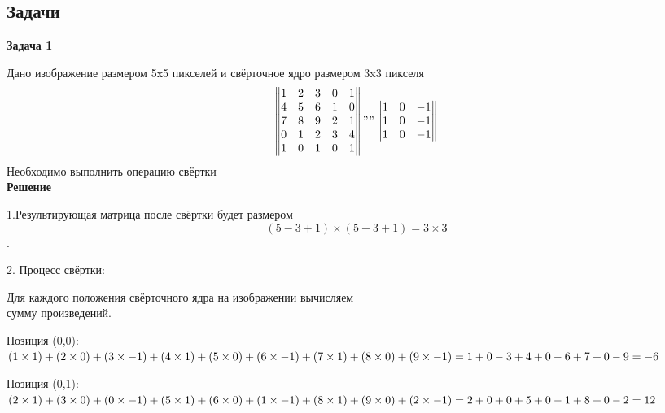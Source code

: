 \begin{description}
\begin{figure}[h]
		      \label{fig:cnn_generalization}

	      \end{figure}

	      \subsection{Задачи}
	      \textbf{Задача 1}

	      Дано изображение размером 5x5 пикселей и свёрточное ядро размером 3x3 пикселя\\

	      \begin{equation*}
		      \begin{Vmatrix}
			      1 & 2 & 3 & 0 & 1 \\
			      4 & 5 & 6 & 1 & 0 \\
			      7 & 8 & 9 & 2 & 1 \\
			      0 & 1 & 2 & 3 & 4 \\
			      1 & 0 & 1 & 0 & 1
		      \end{Vmatrix}
		      ""
		      \begin{Vmatrix}
			      1 & 0 & -1 \\
			      1 & 0 & -1 \\
			      1 & 0 & -1
		      \end{Vmatrix}
	      \end{equation*}
	      Необходимо выполнить операцию свёртки\\
	      \textbf{Решение}

	      1.Результирующая матрица после свёртки будет размером
	      $$ (5-3+1) \times (5-3+1) = 3 \times 3 $$.

	      2. Процесс свёртки:

	      Для каждого положения свёрточного ядра на изображении вычисляем\\
	      сумму произведений.

	      Позиция (0,0):
	      $
		      (1 \times 1) + (2 \times 0) + (3 \times -1) + \\
		      (4 \times 1) + (5 \times 0) + (6 \times -1) + \\
		      (7 \times 1) + (8 \times 0) + (9 \times -1) = \\
		      1 + 0 - 3 + 4 + 0 - 6 + 7 + 0 - 9 = -6
	      $

	      Позиция (0,1):
	      $
		      (2 \times 1) + (3 \times 0) + (0 \times -1) + \\
		      (5 \times 1) + (6 \times 0) + (1 \times -1) + \\
		      (8 \times 1) + (9 \times 0) + (2 \times -1) = \\
		      2 + 0 + 0 + 5 + 0 - 1 + 8 + 0 - 2 = 12
	      $


\end{description}
